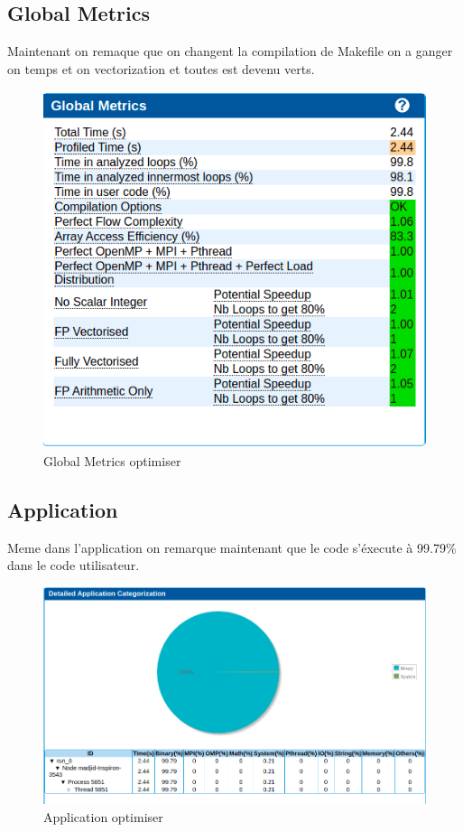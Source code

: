 \documentclass[11pt,a4paper,onecolumn,openright,oneside]{report}
\begin{document}
\subsection{Global Metrics }
Maintenant on remaque que on changent la compilation de Makefile on a ganger on temps et on vectorization et toutes est devenu verts.
\begin{figure}[H]
    \centering
    \includegraphics[scale=0.5]{Images/2/2-1.png}
    \caption{Global Metrics optimiser}
    \label{fig:my_label}
\end{figure}

\subsection{Application }
Meme dans l'application on remarque maintenant que le code s'éxecute à 99.79\% dans le code utilisateur.
\begin{figure}[H]
    \centering
    \includegraphics[scale=0.5]{Images/2/2-3.png}
    \caption{Application optimiser}
    \label{fig:my_label}
\end{figure}
\end{document}
